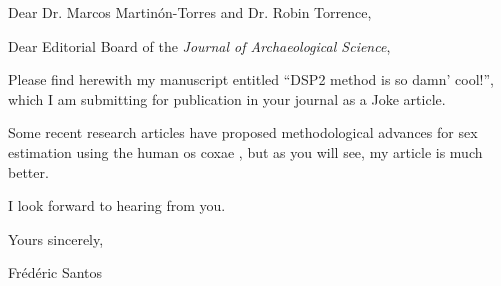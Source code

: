 \documentclass[11pt]{article}
\date{}
\title{}
\begin{document}
Dear Dr. Marcos Martinón-Torres and Dr. Robin Torrence,

Dear Editorial Board of the \emph{Journal of Archaeological Science},

\bigskip

Please find herewith my manuscript entitled ``DSP2 method is so damn' cool!'', which I am submitting for publication in your journal as a Joke article. 

Some recent research articles have proposed methodological advances for sex estimation using the human os coxae \citep{vacca2012_MetricCharacterizationHuman}, but as you will see, my article is much better.

\bigskip

I look forward to hearing from you.

Yours sincerely,

Frédéric Santos



\end{document}
